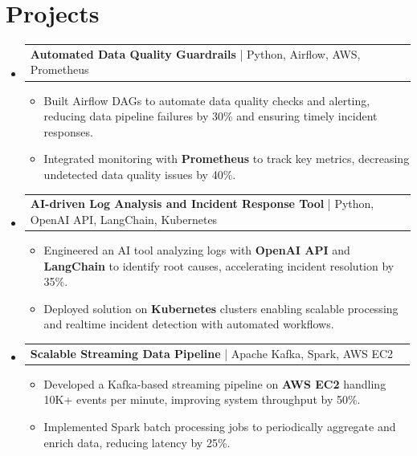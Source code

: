 \documentclass[letterpaper,11pt]{article}
\makeatletter
\newcommand{\resumeItem}[1]{
  \item\footnotesize{
    {#1 \vspace{-2pt}}
  }
}
\newcommand{\resumeProjectHeading}[2]{
    \item
    \begin{tabular*}{1.001\textwidth}{l@{\extracolsep{\fill}}r}
      \small#1 & \textbf{\small #2}\\
    \end{tabular*}\vspace{-7pt}
}
\newcommand{\resumeSubHeadingListStart}{\begin{itemize}[leftmargin=0pt, label={}]}
\newcommand{\resumeSubHeadingListEnd}{\end{itemize}}
\newcommand{\resumeItemListStart}{\begin{itemize}[leftmargin=*]}
\newcommand{\resumeItemListEnd}{\end{itemize}\vspace{-5pt}}
\makeatother
\begin{document}
\section{Projects}
    \vspace{-5pt}
    \resumeSubHeadingListStart
          \resumeProjectHeading
              {\textbf{Automated Data Quality Guardrails} | Python, Airflow, AWS, Prometheus}{}
        \resumeItemListStart
            \resumeItem{Built Airflow DAGs to automate data quality checks and alerting, reducing data pipeline failures by 30\% and ensuring timely incident responses.}
            \resumeItem{Integrated monitoring with \textbf{Prometheus} to track key metrics, decreasing undetected data quality issues by 40\%.}
        \resumeItemListEnd
        \vspace{-12pt}
    
    \resumeProjectHeading
        {\textbf{AI-driven Log Analysis and Incident Response Tool} | Python, OpenAI API, LangChain, Kubernetes}{}
        \resumeItemListStart
            \resumeItem{Engineered an AI tool analyzing logs with \textbf{OpenAI API} and \textbf{LangChain} to identify root causes, accelerating incident resolution by 35\%.}
            \resumeItem{Deployed solution on \textbf{Kubernetes} clusters enabling scalable processing and realtime incident detection with automated workflows.}
        \resumeItemListEnd
          \vspace{-12pt}
      \resumeProjectHeading
          {\textbf{Scalable Streaming Data Pipeline} | Apache Kafka, Spark, AWS EC2}{}
          \resumeItemListStart
              \resumeItem{Developed a Kafka-based streaming pipeline on \textbf{AWS EC2} handling 10K+ events per minute, improving system throughput by 50\%.}
              \resumeItem{Implemented Spark batch processing jobs to periodically aggregate and enrich data, reducing latency by 25\%.}
          \resumeItemListEnd 
    \resumeSubHeadingListEnd
\end{document}

